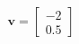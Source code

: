 \documentclass[preview]{standalone}
\begin{document}
\begin{align*}
\mathbf{v}=\begin{bmatrix} -2 \\ 0.5 \end{bmatrix}
\end{align*}
\end{document}
